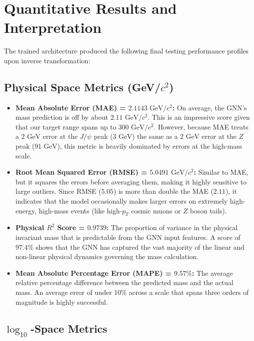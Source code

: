 \documentclass[11pt,a4paper]{article}
\begin{document}
\section{Quantitative Results and Interpretation}

The trained architecture produced the following final testing performance profiles upon inverse transformation:

\subsection{Physical Space Metrics (GeV/$c^2$)}

\begin{itemize}
    \item \textbf{Mean Absolute Error (MAE) = $2.1143\text{ GeV}/c^2$:} 
    On average, the GNN's mass prediction is off by about $2.11\text{ GeV}/c^2$. This is an impressive score given that our target range spans up to $300\text{ GeV}/c^2$. However, because MAE treats a $2\text{ GeV}$ error at the $J/\psi$ peak ($3\text{ GeV}$) the same as a $2\text{ GeV}$ error at the $Z$ peak ($91\text{ GeV}$), this metric is heavily dominated by errors at the high-mass scale.
    
    \item \textbf{Root Mean Squared Error (RMSE) = $5.0491\text{ GeV}/c^2$:} 
    Similar to MAE, but it squares the errors before averaging them, making it highly sensitive to large outliers. Since RMSE ($5.05$) is more than double the MAE ($2.11$), it indicates that the model occasionally makes larger errors on extremely high-energy, high-mass events (like high-$p_T$ cosmic muons or $Z$ boson tails).
    
    \item \textbf{Physical $R^2$ Score = $0.9739$:} 
    The proportion of variance in the physical invariant mass that is predictable from the GNN input features. A score of $97.4\%$ shows that the GNN has captured the vast majority of the linear and non-linear physical dynamics governing the mass calculation.
    
    \item \textbf{Mean Absolute Percentage Error (MAPE) = $9.57\%$:} 
    The average relative percentage difference between the predicted mass and the actual mass. An average error of under $10\%$ across a scale that spans three orders of magnitude is highly successful.
\end{itemize}

\subsection{$\log_{10}$-Space Metrics}
\end{document}
